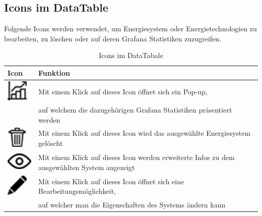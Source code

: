 \subsection{Icons im DataTable}
Folgende Icons werden  verwendet, um Energiesystem oder Energietechnologien zu bearbeiten, zu löschen oder auf deren Grafana Statistiken zuzugreifen.
\begin{table}[h]
	\begin{tabular}[t]{|l|l|}
		\hline
		Icon & Funktion                                                                                     \\ \hline
			\includegraphics[height=1cm,width=1cm]{images/Icons/statistik}& Mit einem Klick auf dieses Icon öffnet sich ein Pop-up,\\& auf welchem die dazugehörigen  Grafana Statistiken präsentiert werden       \\ \hline
			\includegraphics[height=1cm,width=1cm]{images/Icons/delete}  & Mit einem Klick auf dieses Icon wird das ausgewählte Energiesystem gelöscht                  \\ \hline
			\includegraphics[height=1cm,width=1.5cm]{images/Icons/auge} & Mit einem Klick auf dieses Icon werden erweiterte Infos zu dem ausgewählten System angezeigt \\ \hline
			\includegraphics[height=1cm,width=1cm]{images/Icons/stift} & Mit einem Klick auf dieses Icon öffnet sich eine Bearbeitungsmöglichkeit,\\& auf welcher man die Eigenschaften des Systems ändern kann \\ \hline
	\end{tabular}
	\caption{Icons im DataTabale}
\label{tab: Icons im DataTabales}
\end{table}
\newpage

